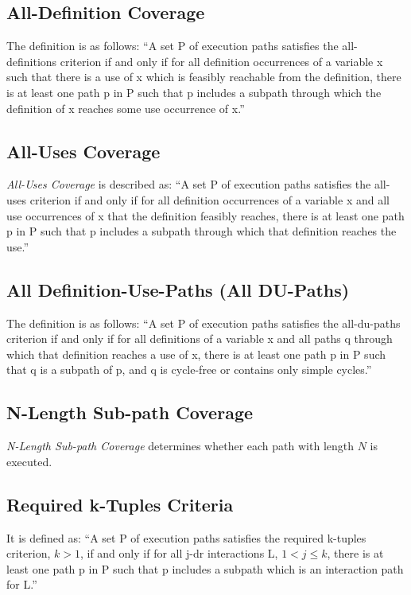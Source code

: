 \documentclass[12pt,a4paper]{report}
\begin{document}
\subsection{All-Definition Coverage}
The definition is as follows:
``A set P of execution paths satisfies the all-definitions criterion if and only if for all definition occurrences of a variable x such that there is a use of x which is feasibly reachable from the definition, there is at least one path p in P such that p includes a subpath through which the definition of x reaches some use occurrence of x.''\cite{Zhu:1997:SUT:267580.267590}

\subsection{All-Uses Coverage}
\emph{All-Uses Coverage} is described as:
``A set P of execution paths satisfies the all-uses criterion if and only if for all definition occurrences of a variable x and all use occurrences of x that the definition feasibly reaches, there is at least one path p in P such that p includes a subpath through which that definition reaches the use.''
\cite{Zhu:1997:SUT:267580.267590}

\subsection{All Definition-Use-Paths (All DU-Paths)}
The definition is as follows:
``A set P of execution paths satisfies the all-du-paths criterion if and only if for all definitions of a variable x and all paths q through which that definition reaches a use of x, there is at least one path p in P such that q is a subpath of p, and q is cycle-free or contains only simple cycles.''
\cite{Zhu:1997:SUT:267580.267590}

\subsection{N-Length Sub-path Coverage}
\emph{N-Length Sub-path Coverage} determines whether each path with length $N$ is executed.

\subsection{Required k-Tuples Criteria}
It is defined as:
``A set P of execution paths satisfies the required k-tuples criterion, $k > 1$, if and only if for all j-dr interactions L, $1 < j \leq k$, there is at least one path p in P such that p includes a subpath which is an interaction path for L.''\cite{Zhu:1997:SUT:267580.267590}
\end{document}
